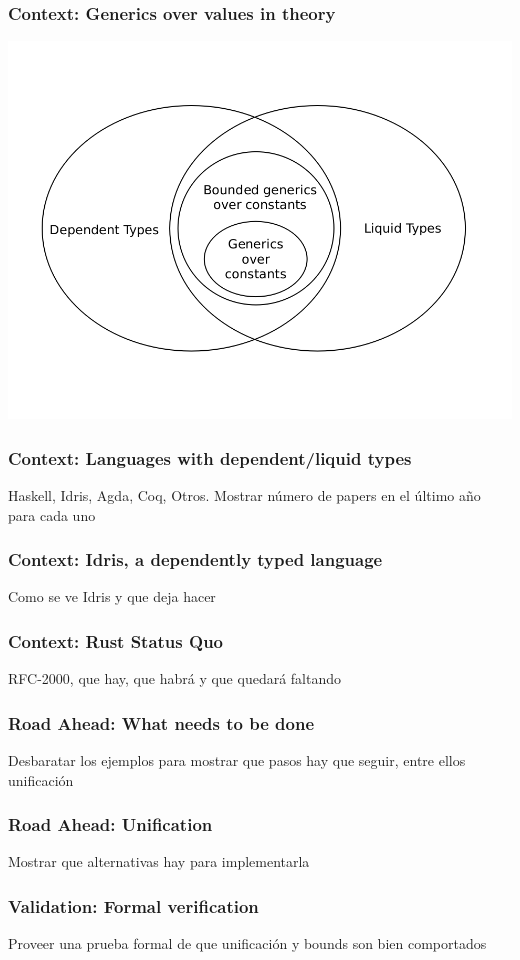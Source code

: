 \documentclass{beamer}
\begin{document}
\begin{frame}[fragile]
    \frametitle{Context: Generics over values in theory}
    \includegraphics[width=\textwidth]{./theory.png}
\end{frame}

\begin{frame}[fragile]
    \frametitle{Context: Languages with dependent/liquid types}
    Haskell, Idris, Agda, Coq, Otros. Mostrar número de papers en el último año para cada uno
\end{frame}

\begin{frame}[fragile]
    \frametitle{Context: Idris, a dependently typed language}
    Como se ve Idris y que deja hacer
\end{frame}

\begin{frame}[fragile]
    \frametitle{Context: Rust Status Quo}
    RFC-2000, que hay, que habrá y que quedará faltando
\end{frame}

\begin{frame}[fragile]
    \frametitle{Road Ahead: What needs to be done}
    Desbaratar los ejemplos para mostrar que pasos hay que seguir, entre ellos unificación
\end{frame}

\begin{frame}[fragile]
    \frametitle{Road Ahead: Unification}
    Mostrar que alternativas hay para implementarla
\end{frame}

\begin{frame}[fragile]
    \frametitle{Validation: Formal verification}
    Proveer una prueba formal de que unificación y bounds son bien comportados 
\end{frame}
\end{document}
